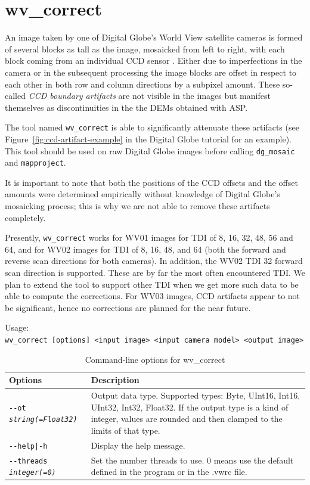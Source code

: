 \section{wv\_correct}
\label{wvcorrect}

An image taken by one of Digital Globe's World View satellite cameras is
formed of several blocks as tall as the image, mosaicked from left to
right, with each block coming from an individual CCD sensor
\cite{digital-globe:camera}. Either due to imperfections in the camera
or in the subsequent processing the image blocks are offset in
respect to each other in both row and column directions by a subpixel
amount. These so-called {\it CCD boundary artifacts} are not visible in
the images but manifest themselves as discontinuities in the the DEMs
obtained with ASP.

The tool named \texttt{wv\_correct} is able to significantly attenuate
these artifacts (see Figure~\ref{fig:ccd-artifact-example} in the
Digital Globe tutorial for an example). This tool should be used on raw
Digital Globe images before calling \texttt{dg\_mosaic} and
\texttt{mapproject}.

It is important to note that both the positions of the CCD offsets and
the offset amounts were determined empirically without knowledge of
Digital Globe's mosaicking process; this is why we are not able to
remove these artifacts completely.

Presently, \texttt{wv\_correct} works for WV01 images for TDI of 8, 16, 32,
48, 56 and 64, and for WV02 images for TDI of 8, 16, 48, and 64 (both the
forward and reverse scan directions for both cameras). In addition, the
WV02 TDI 32 forward scan direction is supported. These are by far the
most often encountered TDI. We plan to extend the tool to support other
TDI when we get more such data to be able to compute the
corrections. For WV03 images, CCD artifacts appear to not be
significant, hence no corrections are planned for the near future.

\medskip

Usage:\\
\hspace*{2em}\texttt{wv\_correct [options] <input image> <input camera model> <output image>}

\medskip

\begin{longtable}{|p{8cm}|p{9cm}|}
\caption{Command-line options for wv\_correct}
\label{tbl:wvcorrect}
\endfirsthead
\endhead
\endfoot
\endlastfoot
\hline
Options & Description \\ \hline \hline
\texttt{-\/-ot \textit{string(=Float32)}} & Output data type. Supported types: Byte, UInt16, Int16, UInt32, Int32, Float32. If the output type is a kind of integer, values are rounded and then clamped to the limits of that type. \\ \hline
\texttt{-\/-help|-h} & Display the help message.\\ \hline
\texttt{-\/-threads \textit{integer(=0)}} & Set the number threads to
use. 0 means use the default defined in the program or in the .vwrc file. \\ \hline
\end{longtable}



